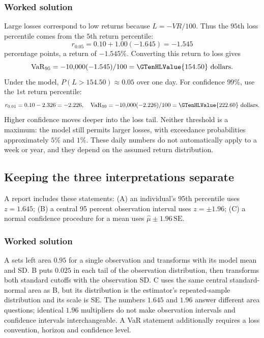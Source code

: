 \subsubsection*{Worked solution}\label{sol:sec:advanced0}
Large losses correspond to low returns because $L=-VR/100$. Thus the $95$th loss percentile comes from the $5$th return percentile:
\[
r_{0.05}=0.10+1.00(-1.645)=-1.545
\]
percentage points, a return of $-1.545\%$. Converting this return to loss gives
\[
\mathrm{VaR}_{95}=-10{,}000(-1.545)/100=\GTenHLValue{154.50}\text{ dollars}.
\]
Under the model, $P(L>154.50)\approx0.05$ over one day. For confidence $99\%$, use the $1$st return percentile:
\[
r_{0.01}=0.10-2.326=-2.226,\quad
\mathrm{VaR}_{99}=-10{,}000(-2.226)/100=\GTenHLValue{222.60}\text{ dollars}.
\]
Higher confidence moves deeper into the loss tail. Neither threshold is a maximum: the model still permits larger losses, with exceedance probabilities approximately $5\%$ and $1\%$. These daily numbers do not automatically apply to a week or year, and they depend on the assumed return distribution.


\subsection{Keeping the three interpretations separate}\label{prob:sec:advanced1}
A report includes these statements: (A) an individual's 95th percentile uses $z=1.645$; (B) a central 95 percent observation interval uses $z=\pm1.96$; (C) a normal confidence procedure for a mean uses $\widehat\mu\pm1.96\,\mathrm{SE}$.
\subsubsection*{Worked solution}\label{sol:sec:advanced1}
A sets left area $0.95$ for a single observation and transforms with its model mean and SD. B puts $0.025$ in each tail of the observation distribution, then transforms both standard cutoffs with the observation SD. C uses the same central standard-normal area as B, but its distribution is the estimator's repeated-sample distribution and its scale is SE. The numbers $1.645$ and $1.96$ answer different area questions; identical $1.96$ multipliers do not make observation intervals and confidence intervals interchangeable. A VaR statement additionally requires a loss convention, horizon and confidence level.



